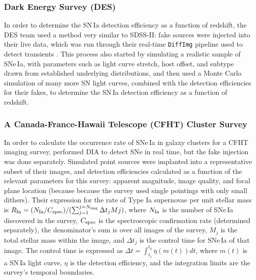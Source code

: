 \subsubsection{Dark Energy Survey (DES)}

In order to determine the SN\,Ia detection efficiency as a function of redshift, the DES team used a method very similar to SDSS-II: fake sources were injected into their live data, which was run through their real-time {\tt DiffImg} pipeline used to detect transients \cite{2015AJ....150..172K}.
This process also started by simulating a realistic sample of SNe\,Ia, with parameters such as light curve stretch, host offset, and subtype drawn from established underlying distributions, and then used a Monte Carlo simulation of many more SN light curves, combined with the detection efficiencies for their fakes, to determine the SN\,Ia detection efficiency as a function of redshift.

\subsubsection{A Canada-France-Hawaii Telescope (CFHT) Cluster Survey}\label{ssec:sci_cfht}

In order to calculate the occurrence rate of SNe\,Ia in galaxy clusters for a CFHT imaging survey, \cite{2012ApJ...746..163S} performed DIA to detect SNe in real time, but the fake injection was done separately.
Simulated point sources were implanted into a representative subset of their images, and detection efficiencies calculated as a function of the relevant parameters for this survey: apparent magnitude, image quality, and focal plane location (because because the survey used single pointings with only small dithers).
Their expression for the rate of Type Ia supernovae per unit stellar mass is $R_{\rm Ia} = (N_{\rm Ia} / C_{\rm spec}) / ( \sum_{j=1}^{j=N_{\rm img}} \Delta t_j Mj )$, where $N_{\rm Ia}$ is the number of SNe\,Ia discovered in the survey, $C_{\rm spec}$ is the spectroscopic confirmation rate (determined separately), the denominator's sum is over all images of the survey, $M_j$ is the total stellar mass within the image, and $\Delta t_j$ is the control time for SNe\,Ia of that image.
The control time is expressed as $\Delta t = \int_{t_1}^{t_2} \eta(m(t)) dt$, where $m(t)$ is a SN\,Ia light curve, $\eta$ is the detection efficiency, and the integration limits are the survey's temporal boundaries.

